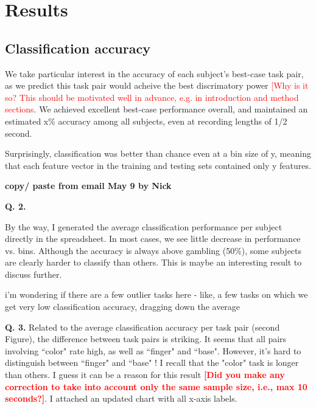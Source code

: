 \section{Results}

\subsection{Classification accuracy}

We take particular interest in the accuracy of each subject's best-case task pair, as we predict this task pair would acheive the best discrimatory power \textcolor{red}{[Why is it so? This should be motivated well in advance, e.g. in introduction and method sections}.  We achieved excellent best-case performance overall, and maintained an estimated x\% accuracy among all subjects, even at recording lengths of 1/2 second.


Surprisingly, classification was better than chance even at a bin size of y, meaning that each feature vector in the training and testing sets contained only y features.

{\bf copy/ paste from email May 9 by Nick}

{\bf Q. 2.}

    By the way, I generated the average classification performance per subject directly in the spreadsheet. In most cases, we see little decrease in performance vs. bins. Although the accuracy is always above gambling (50\%), some subjects are clearly harder to classify than others. This is maybe an interesting result to discuss further.



\begin{figure}
\begin{center}
\caption{ }
\label{ }
\end{center}
\end{figure}


i'm wondering if there are a few outlier tasks here - like, a few tasks on which we get very low classification accuracy, dragging down the average
 

{\bf Q. 3.} Related to the average classification accuracy per task pair (second Figure), the difference between task pairs is striking. It seems that all pairs involving ``color" rate high, as well as ``finger" and ``base". However, it's hard to distinguish between ``finger" and ``base" ! I recall that the "color" task is longer than others. I guess it can be a reason for this result \textcolor{red}{\bf [Did you make any correction to take into account only the same sample size, i.e., max 10 seconds?]}. I attached an updated chart with all x-axis labels.

